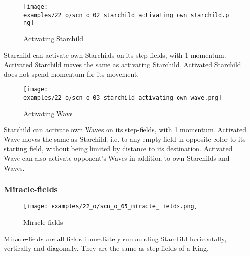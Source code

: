 \vspace*{-0.9\baselineskip}
\noindent
\begin{wrapfigure}[7]{l}{0.4\textwidth}
\centering
\texttt{[image: examples/22\_o/scn\_o\_02\_starchild\_activating\_own\_starchild.png]}
\caption{Activating Starchild}
\label{fig:scn_o_02_starchild_activating_own_starchild}
\end{wrapfigure}
Starchild can activate own Starchilds on its step-fields, with 1 momentum. Activated
Starchild moves the same as activating Starchild. Activated Starchild does not spend
momentum for its movement.

\noindent
\begin{wrapfigure}[10]{l}{0.4\textwidth}
\centering
\texttt{[image: examples/22\_o/scn\_o\_03\_starchild\_activating\_own\_wave.png]}
\caption{Activating Wave}
\label{fig:scn_o_03_starchild_activating_own_wave}
\end{wrapfigure}
Starchild can activate own Waves on its step-fields, with 1 momentum. Activated Wave
moves the same as Starchild, i.e. to any empty field in opposite color to its starting
field, without being limited by distance to its destination. \newline
\indent
Activated Wave can also activate opponent's Waves in addition to own Starchilds and
Waves.

\clearpage %

\subsubsection*{Miracle-fields}
\label{sec:One/Starchild/Movement/Miracle-fields}

\noindent
\begin{wrapfigure}[5]{l}{0.4\textwidth}
\centering
\texttt{[image: examples/22\_o/scn\_o\_05\_miracle\_fields.png]}
\caption{Miracle-fields}
\label{fig:scn_o_05_miracle_fields}
\end{wrapfigure}
Miracle-fields are all fields immediately surrounding Starchild horizontally,
vertically and diagonally. They are the same as step-fields of a King.

\vspace*{2.1\baselineskip}
